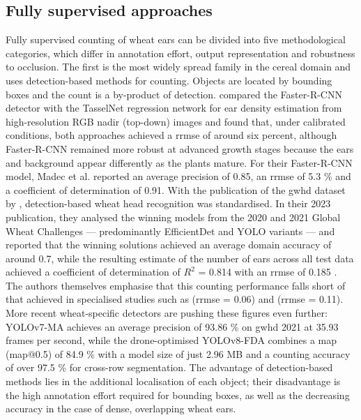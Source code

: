 \documentclass[12pt,parskip = half, DIV=classic,listof=totoc]{scrartcl}
\begin{document}
			\subsection{Fully supervised approaches}
			Fully supervised counting of wheat ears can be divided into five methodological categories, which differ in annotation effort, output representation and robustness to occlusion.
			The first is the most widely spread family in the cereal domain and uses detection-based methods for counting. Objects are located by bounding boxes and the count is a by-product of detection.
			\textcite{madecEarDensityEstimation2019} compared the Faster-R-CNN detector with the TasselNet regression network for ear density estimation 
			from high-resolution RGB nadir (top-down) images and found that, under calibrated conditions, both approaches achieved a \ac{rrmse} of around six percent, 
			although Faster-R-CNN remained more robust at advanced growth stages because the ears and background appear differently as the plants mature. 
			For their Faster-R-CNN model, Madec et al. reported an average precision of 0.85, an \ac{rrmse} of 5.3 \% and a coefficient of determination of 0.91.
			With the publication of the \ac{gwhd} dataset by \textcite{davidGlobalWheatHead2021}, detection-based wheat head recognition was standardised. In their 2023 publication,
			they analysed the winning models from the 2020 and 2021 Global Wheat Challenges \cite{davidGlobalWheatHead2020,davidGlobalWheatHead2021} --- predominantly EfficientDet and YOLO variants --- and reported that the 
			winning solutions achieved an average domain accuracy of around 0.7, while the resulting estimate of the number of ears across all test data achieved a coefficient of determination of 
			$R^2$ = 0.814 with an \ac{rrmse} of 0.185 \cite{davidGlobalWheatHead2023}. The authors themselves emphasise that this counting performance falls short of that achieved in specialised studies such as  
			\textcite{madecEarDensityEstimation2019} (\ac{rrmse} = 0.06) and \textcite{sadeghi-tehranDeepCountInFieldAutomatic2019c} (\ac{rrmse} = 0.11).
			More recent wheat-specific detectors are pushing these figures even further: YOLOv7-MA \cite{mengYOLOv7MAImprovedYOLOv7Based2023} achieves an average precision of 93.86 \% on \ac{gwhd} 2021 at 
			35.93 frames per second, while the drone-optimised YOLOv8-FDA \cite{linYOLOv8FDALightweightWheat2025} combines a \acl{map} (\acs*{map}@0.5) of 84.9 \% with a model size of just 2.96 MB 
			and a counting accuracy of over 97.5 \% for cross-row segmentation. The advantage of detection-based methods lies in the additional localisation of each object; 
			their disadvantage is the high annotation effort required for bounding boxes, as well as the decreasing accuracy in the case of dense, overlapping wheat ears.
\end{document}
